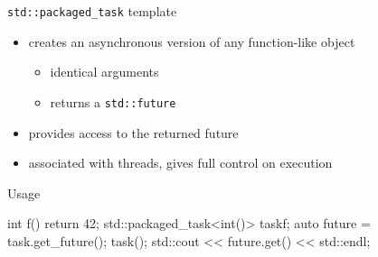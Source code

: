 \begin{frame}[fragile]
  \begin{block}{\texttt{std::packaged\_task} template}
    \begin{itemize}
    \item creates an asynchronous version of any function-like object
      \begin{itemize}
      \item identical arguments
      \item returns a \texttt{std::future}
      \end{itemize}
    \item provides access to the returned future
    \item associated with threads, gives full control on execution
    \end{itemize}
  \end{block}
  \pause
  \begin{exampleblock}{Usage}
    \begin{cppcode*}{}
      int f() { return 42; }
      std::packaged_task<int()> task{f};
      auto future = task.get_future();
      task();
      std::cout << future.get() << std::endl;
    \end{cppcode*}
  \end{exampleblock}
\end{frame}
